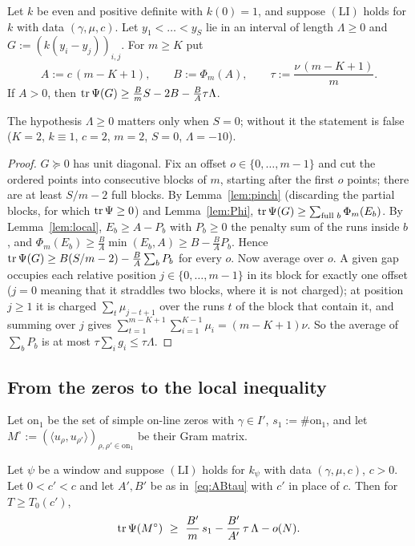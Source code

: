 \begin{proposition}[Packing]\label{prop:pack}
Let $k$ be even and positive definite with $k(0)=1$, and suppose $(\mathrm{LI})$ holds for $k$ with data $(\gamma,\mu,c)$. Let
$y_1<\dots<y_S$ lie in an interval of length $\Lambda\ge0$ and $G:=(k(y_i-y_j))_{i,j}$. For $m\ge K$ put
\begin{equation}\label{eq:ABtau}
A:=c\,(m-K+1),\qquad B:=\Phi_m(A),\qquad \tau:=\frac{\nu\,(m-K+1)}m .
\end{equation}
If $A>0$, then $\operatorname{tr}\Psi(G)\ge\frac BmS-2B-\frac BA\tau\Lambda$.
\end{proposition}

The hypothesis $\Lambda\ge0$ matters only when $S=0$; without it the statement is false ($K=2$, $k\equiv1$, $c=2$, $m=2$, $S=0$, $\Lambda=-10$).

\begin{proof}
$G\succeq0$ has unit diagonal. Fix an offset $o\in\{0,\dots,m-1\}$ and cut the ordered points into consecutive blocks of $m$, starting after
the first $o$ points; there are at least $S/m-2$ full blocks. By Lemma~\ref{lem:pinch} (discarding the partial blocks, for which
$\operatorname{tr}\Psi\ge0$) and Lemma~\ref{lem:Phi}, $\operatorname{tr}\Psi(G)\ge\sum_{\text{full }b}\Phi_m(E_b)$. By Lemma~\ref{lem:local}, $E_b\ge A-P_b$ with
$P_b\ge0$ the penalty sum of the runs inside $b$, and $\Phi_m(E_b)\ge\frac BA\min(E_b,A)\ge B-\frac BAP_b$. Hence
$\operatorname{tr}\Psi(G)\ge B(S/m-2)-\frac BA\sum_bP_b$ for every $o$. Now average over $o$. A given gap occupies each relative position
$j\in\{0,\dots,m-1\}$ in its block for exactly one offset ($j=0$ meaning that it straddles two blocks, where it is not charged); at position
$j\ge1$ it is charged $\sum_t\mu_{j-t+1}$ over the runs $t$ of the block that contain it, and summing over $j$ gives
$\sum_{t=1}^{m-K+1}\sum_{i=1}^{K-1}\mu_i=(m-K+1)\nu$. So the average of $\sum_bP_b$ is at most $\tau\sum_ig_i\le\tau\Lambda$.
\end{proof}

\subsection{From the zeros to the local inequality}
Let $\mathrm{on}_1$ be the set of simple on-line zeros with $\gamma\in I'$, $s_1:=\#\mathrm{on}_1$, and let
$M^\circ:=(\langle u_\rho,u_{\rho'}\rangle)_{\rho,\rho'\in\mathrm{on}_1}$ be their Gram matrix.

\begin{lemma}[Transfer]\label{lem:transfer}
Let $\psi$ be a window and suppose $(\mathrm{LI})$ holds for $k_\psi$ with data $(\gamma,\mu,c)$, $c>0$. Let $0<c'<c$ and let $A',B'$ be as
in~\eqref{eq:ABtau} with $c'$ in place of $c$. Then for $T\ge T_0(c')$,
\[
\tr\Psi(M^\circ)\ \ge\ \frac{B'}m\,s_1-\frac{B'}{A'}\,\tau\,\Lambda-o(N).
\]
\end{lemma}

